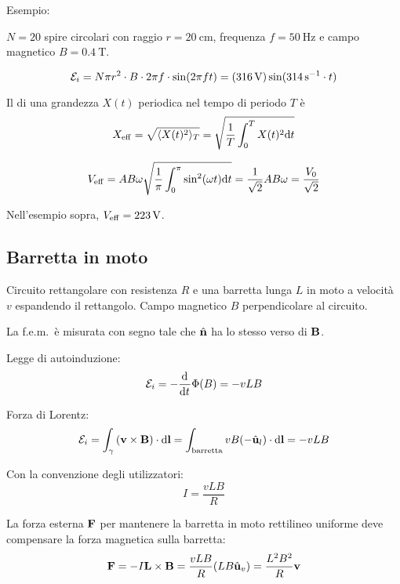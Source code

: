 Esempio:

$N = 20$ spire circolari con raggio $r = \qty{20}{\centi\metre}$, frequenza $f = \qty{50}{\hertz}$ e campo magnetico $B = \qty{0.4}{\tesla}$.

\begin{equation}
    \mathcal{E}_i = N \pi r^2 \cdot B \cdot 2\pi f \cdot \sin(2\pi f t)
    = (\qty{316}{\volt}) \sin(\qty{314}{\per\second} \cdot t)
\end{equation}

Il  di una grandezza $X(t)$ periodica nel tempo di periodo $T$ è
\begin{equation}
    X_\mathrm{eff} = \sqrt{\langle X(t)^2 \rangle_T}
    = \sqrt{\frac{1}{T} \int_0^T X(t)^2 \mathrm{d} t}
\end{equation}

\begin{equation}
    V_\mathrm{eff} = AB\omega \sqrt{\frac{1}{\pi} \int_0^\pi \sin^2(\omega t) \mathrm{d} t}
    = \frac{1}{\sqrt{2}} A B \omega
    = \frac{V_0}{\sqrt{2}}
\end{equation}

Nell'esempio sopra, $V_\mathrm{eff} = \qty{223}{\volt}$.

\subsection{Barretta in moto}

Circuito rettangolare con resistenza $R$ e una barretta lunga $L$ in moto a velocità $v$ espandendo il rettangolo.
Campo magnetico $B$ perpendicolare al circuito.

La f.e.m.\ è misurata con segno tale che $\hat{\mathbf{n}}$ ha lo stesso verso di $\mathbf{B}$.

Legge di autoinduzione:
\begin{equation}
    \fem_i = - \der{t} \Phi(B) = - v L B
\end{equation}

Forza di Lorentz:
\begin{equation}
    \mathcal{E}_i = \int_\gamma \left( \mathbf{v} \times \mathbf{B} \right) \cdot \mathrm{d} \mathbf{l}
    = \int_\text{barretta} v B (-\hat{\mathbf{u}}_{l}) \cdot \mathrm{d} \mathbf{l}
    = - v L B
\end{equation}

Con la convenzione degli utilizzatori:
\begin{equation}
    I = \frac{v L B}{R}
\end{equation}

La forza esterna $\mathbf{F}$ per mantenere la barretta in moto rettilineo uniforme deve compensare la forza magnetica sulla barretta:
\begin{equation}
    \mathbf{F} = - I \mathbf{L} \times \mathbf{B}
    = \frac{vLB}{R} (L B \hat{\mathbf{u}}_{v})
    = \frac{L^2 B^2}{R} \mathbf{v}
\end{equation}

